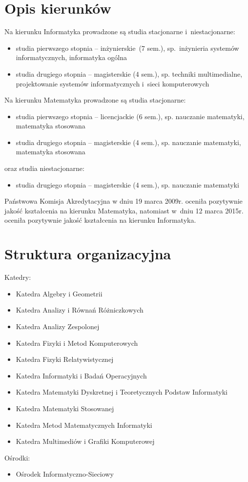 \documentclass[a4paper,11pt]{article}
\begin{document}
\section{Opis kierunków} 
Na kierunku Informatyka prowadzone są studia stacjonarne i~niestacjonarne:
\begin{itemize}\begin{itemize}
\item studia pierwszego stopnia – inżynierskie~(7 sem.), sp.~inżynieria systemów informatycznych, informatyka
ogólna

\item studia drugiego stopnia – magisterskie (4 sem.), sp. techniki multimedialne, projektowanie systemów
informatycznych i~sieci komputerowych
\end{itemize}
Na kierunku Matematyka prowadzone są studia stacjonarne:
\begin{itemize}
\item studia pierwszego stopnia – licencjackie (6 sem.), sp. nauczanie matematyki, matematyka stosowana

\item studia drugiego stopnia – magisterskie (4 sem.), sp. nauczanie matematyki, matematyka stosowana
\end{itemize}
oraz studia niestacjonarne:
\begin{itemize}
\item studia drugiego stopnia – magisterskie (4 sem.), sp. nauczanie matematyki
\end{itemize}
Państwowa Komisja Akredytacyjna w dniu 19 marca 2009r. oceniła pozytywnie jakość kształcenia na kierunku
Matematyka, natomiast w~dniu 12 marca 2015r. oceniła pozytywnie jakość kształcenia na kierunku
Informatyka.

\section{Struktura organizacyjna} 
Katedry:
\begin{itemize}
\item Katedra Algebry i Geometrii
\item Katedra Analizy i Równań Różniczkowych
\item Katedra Analizy Zespolonej
\item Katedra Fizyki i Metod Komputerowych
\item Katedra Fizyki Relatywistycznej
\item Katedra Informatyki i Badań Operacyjnych
\item Katedra Matematyki Dyskretnej i Teoretycznych Podstaw Informatyki
\item Katedra Matematyki Stosowanej
\item Katedra Metod Matematycznych Informatyki
\item Katedra Multimediów i Grafiki Komputerowej
\end{itemize}
Ośrodki:
\begin{itemize}
\item Ośrodek Informatyczno-Sieciowy
\end{itemize}

\end{itemize}
\end{document}
